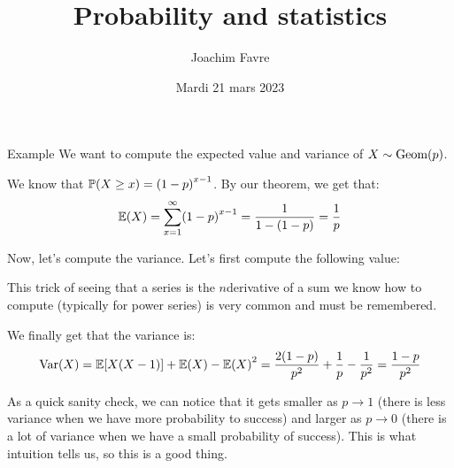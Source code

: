 \documentclass[a4paper]{article}
\title{Probability and statistics}
\author{Joachim Favre}
\date{Mardi 21 mars 2023}
\begin{document}
\maketitle


\begin{parag}{Example}
    We want to compute the expected value and variance of $X \followsdistr \text{Geom}\left(p\right)$.

    We know that $\prob\left(X \geq x\right) = \left(1-p\right)^{x-1}$. By our theorem, we get that: 
    \[\exval\left(X\right) = \sum_{x=1}^{\infty} \left(1-p\right)^{x-1} = \frac{1}{1 - \left(1-p\right)} = \frac{1}{p}\]

    Now, let's compute the variance. Let's first compute the following value: 
    
    This trick of seeing that a series is the $n$\Th derivative of a sum we know how to compute (typically for power series) is very common and must be remembered. 

    We finally get that the variance is: 
    \[\Var\left(X\right) = \exval\left[X\left(X-1\right)\right] + \exval\left(X\right) - \exval\left(X\right)^2 = \frac{2\left(1-p\right)}{p^2} + \frac{1}{p} - \frac{1}{p^2} = \frac{1-p}{p^2}\]

    As a quick sanity check, we can notice that it gets smaller as $p\to1$ (there is less variance when we have more probability to success) and larger as $p\to0$ (there is a lot of variance when we have a small probability of success). This is what intuition tells us, so this is a good thing.
\end{parag}
\end{document}
